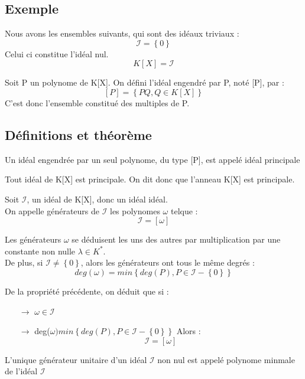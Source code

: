 \subsection{Exemple}
Nous avons les ensembles suivants, qui sont des idéaux triviaux : 
$$\mathcal{I} = \left\lbrace 0 \right\rbrace $$
Celui ci constitue l'idéal nul.
$$K[X] = \mathcal{I}$$
\begin{de}
Soit P un polynome de K[X]. On défini l'idéal engendré par P, noté [P], par : 
$$[P] = \left\lbrace PQ, Q \in K[X]\right\rbrace $$
C'est donc l'ensemble constitué des multiples de P.
\end{de}
\subsection{Définitions et théorème}
\begin{de}
Un idéal engendrée par un seul polynome, du type [P], est appelé idéal principale
\end{de}
\begin{theo}
Tout idéal de K[X] est principale. On dit donc que l'anneau K[X] est principale. 
\end{theo}
\begin{de}
Soit $\mathcal{I}$, un idéal de K[X], donc un idéal idéal.\\
On appelle générateurs de $\mathcal{I}$ les polynomes $\omega$ telque : 
$$\mathcal{I} = [\omega]$$
\end{de}
\begin{prop}
Les générateurs $\omega$ se déduisent les uns des autres par multiplication par une constante non nulle $\lambda \in K^*$.\\
De plus, si $\mathcal{I} \neq \left\lbrace 0 \right\rbrace $, alors les générateurs ont tous le même degrés : 
$$deg(\omega) = min\left\lbrace deg(P), P \in \mathcal{I}-\left\lbrace  0\right\rbrace  \right\rbrace  $$
\end{prop}
\begin{prop}
De la propriété précédente, on déduit que si : 
\begin{itemize}
 \item[$\rightarrow$] $\omega \in \mathcal{I}$
 \item[$\rightarrow$] deg($\omega) min\left\lbrace deg(P), P \in \mathcal{I}-\left\lbrace  0 \right\rbrace\right\rbrace $
Alors : 
$$\mathcal{I} = [\omega]$$ 
\end{itemize}
\end{prop}
\begin{de}
L'unique générateur unitaire d'un idéal $\mathcal{I}$ non nul est appelé polynome minmale de l'idéal $\mathcal{I}$
\end{de}
